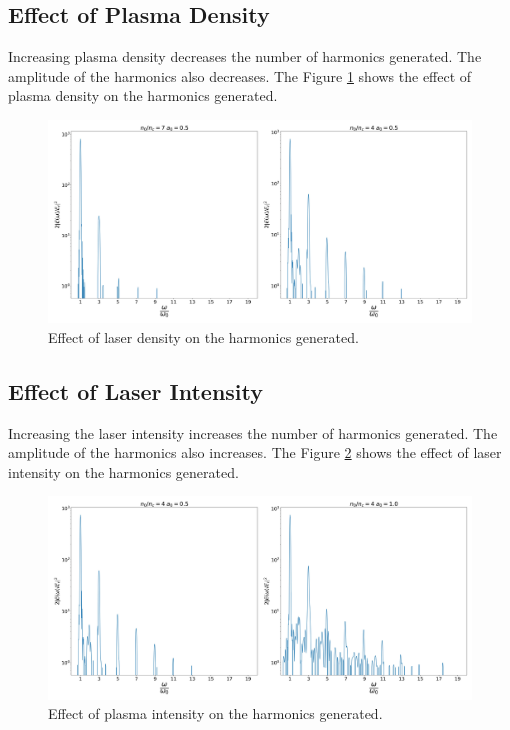 \documentclass[12pt]{article}
\newenvironment{changemargin}[2]{%
\begin{list}{}{%
\setlength{\topsep}{0pt}%
\setlength{\leftmargin}{#1}%
\setlength{\rightmargin}{#2}%
\setlength{\listparindent}{\parindent}%
\setlength{\itemindent}{\parindent}%
\setlength{\parsep}{\parskip}%
}%
\item[]}{\end{list}}
\begin{document}
\begin{changemargin}{-2cm}{-2cm}
    \subsection{Effect of Plasma Density}
    Increasing plasma density decreases the number of harmonics generated. The amplitude of the harmonics also decreases. The Figure \ref{fig:density} shows the effect of plasma density on the harmonics generated.
    \begin{figure}[h]
        \centering
        \includegraphics[width=1.0\textwidth]{images/density.jpg}
        \caption{Effect of laser density on the harmonics generated.}
        \label{fig:density}
    \end{figure}
    \subsection{Effect of Laser Intensity}
    Increasing the laser intensity increases the number of harmonics generated. The amplitude of the harmonics also increases. The Figure \ref{fig:intensity} shows the effect of laser intensity on the harmonics generated.

    \begin{figure}[h]
        \centering
        \includegraphics[width=1.0\textwidth, height=0.4\textwidth]{images/intensity.jpg}
        \caption{Effect of plasma intensity on the harmonics generated.}
        \label{fig:intensity}
    \end{figure}

\end{changemargin}
\end{document}
